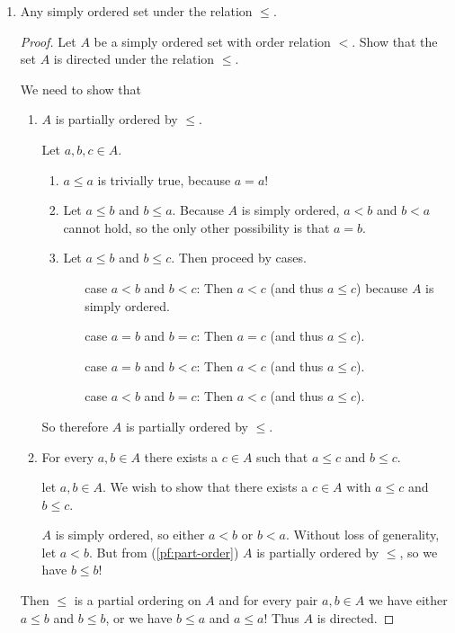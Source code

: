 \documentclass[12pt]{article}
\begin{document}
\begin{enumerate}
	\item Any simply ordered set under the relation $\leq$.
	      \begin{proof}
		      Let $A$ be a simply ordered set with order relation $<$. Show that the set $A$ is
		      directed under the relation $\leq$.

		      We need to show that
		      \begin{enumerate}
			      \item\label{pf:part-order} $A$ is partially ordered by $\leq$.

			            Let $a, b, c \in A$.
			            \begin{enumerate}
				            \item $a \leq a$ is trivially true, because $a = a$!
				            \item Let $a \leq b$ and $b \leq a$. Because $A$ is simply ordered, $a
					                  < b$ and $b < a$ cannot hold, so the only other possibility is that $a = b$.
				            \item Let $a \leq b$ and $b \leq c$. Then proceed by cases.
				                  \begin{itemize}
					                  \item[case $a < b$ and $b < c$:] Then $a < c$ (and thus $a
						                        \leq c$) because $A$ is simply ordered.
					                  \item[case $a = b$ and $b = c$:] Then $a = c$ (and thus $a
						                        \leq c$).
					                  \item[case $a = b$ and $b < c$:] Then $a < c$ (and thus $a
						                        \leq c$).
					                  \item[case $a < b$ and $b = c$:] Then $a < c$ (and thus $a
						                        \leq c$).
				                  \end{itemize}
			            \end{enumerate}
			            So therefore $A$ is partially ordered by $\leq$.
			      \item\label{pf:part-directed} For every $a, b \in A$ there exists a $c \in A$
			            such that $a \leq c$ and $b \leq c$.

			            let $a, b \in A$. We wish to show that there exists a $c \in A$ with $a
				            \leq c$ and $b \leq c$.

			            $A$ is simply ordered, so either $a < b$ or $b < a$. Without loss of
			            generality, let $a < b$. But from (\ref{pf:part-order}) $A$ is partially ordered by $\leq$, so we
			            have $b \leq b$!
		      \end{enumerate}
		      Then $\leq$ is a partial ordering on $A$ and for every pair $a, b \in A$ we have
		      either $a \leq b$ and $b \leq b$, or we have $b \leq a$ and $a \leq a$! Thus $A$ is directed.
	      \end{proof}


\end{enumerate}
\end{document}
